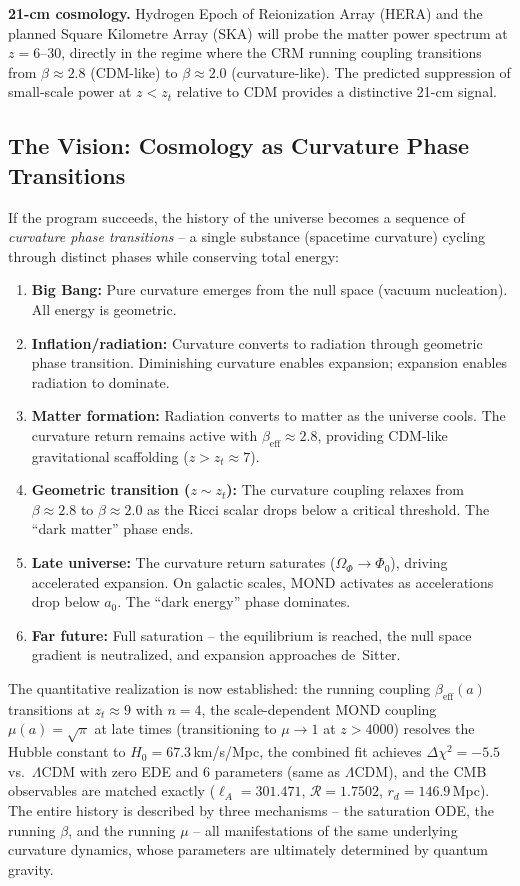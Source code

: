 \documentclass[aps,prd,twocolumn,superscriptaddress,nofootinbib]{revtex4-2}
\begin{document}
\textbf{21-cm cosmology.} Hydrogen Epoch of Reionization Array (HERA) and the planned Square Kilometre Array (SKA) will probe the matter power spectrum at $z = 6$--$30$, directly in the regime where the CRM running coupling transitions from $\beta \approx 2.8$ (CDM-like) to $\beta \approx 2.0$ (curvature-like). The predicted suppression of small-scale power at $z < z_t$ relative to CDM provides a distinctive 21-cm signal.

\subsection{The Vision: Cosmology as Curvature Phase Transitions}

If the program succeeds, the history of the universe becomes a sequence of \textit{curvature phase transitions} -- a single substance (spacetime curvature) cycling through distinct phases while conserving total energy:

\begin{enumerate}
\item \textbf{Big Bang:} Pure curvature emerges from the null space (vacuum nucleation). All energy is geometric.
\item \textbf{Inflation/radiation:} Curvature converts to radiation through geometric phase transition. Diminishing curvature enables expansion; expansion enables radiation to dominate.
\item \textbf{Matter formation:} Radiation converts to matter as the universe cools. The curvature return remains active with $\beta_{\mathrm{eff}} \approx 2.8$, providing CDM-like gravitational scaffolding ($z > z_t \approx 7$).
\item \textbf{Geometric transition ($z \sim z_t$):} The curvature coupling relaxes from $\beta \approx 2.8$ to $\beta \approx 2.0$ as the Ricci scalar drops below a critical threshold. The ``dark matter'' phase ends.
\item \textbf{Late universe:} The curvature return saturates ($\Omega_\Phi \to \Phi_0$), driving accelerated expansion. On galactic scales, MOND activates as accelerations drop below $a_0$. The ``dark energy'' phase dominates.
\item \textbf{Far future:} Full saturation -- the equilibrium is reached, the null space gradient is neutralized, and expansion approaches de~Sitter.
\end{enumerate}

The quantitative realization is now established: the running coupling $\beta_{\mathrm{eff}}(a)$ transitions at $z_t \approx 9$ with $n = 4$, the scale-dependent MOND coupling $\mu(a) = \sqrt{\pi}$ at late times (transitioning to $\mu \to 1$ at $z > 4000$) resolves the Hubble constant to $H_0 = 67.3$\,km/s/Mpc, the combined fit achieves $\Delta\chi^2 = -5.5$ vs.\ $\Lambda$CDM with zero EDE and 6 parameters (same as $\Lambda$CDM), and the CMB observables are matched exactly ($\ell_A = 301.471$, $\mathcal{R} = 1.7502$, $r_d = 146.9$\,Mpc). The entire history is described by three mechanisms -- the saturation ODE, the running $\beta$, and the running $\mu$ -- all manifestations of the same underlying curvature dynamics, whose parameters are ultimately determined by quantum gravity.
\end{document}
